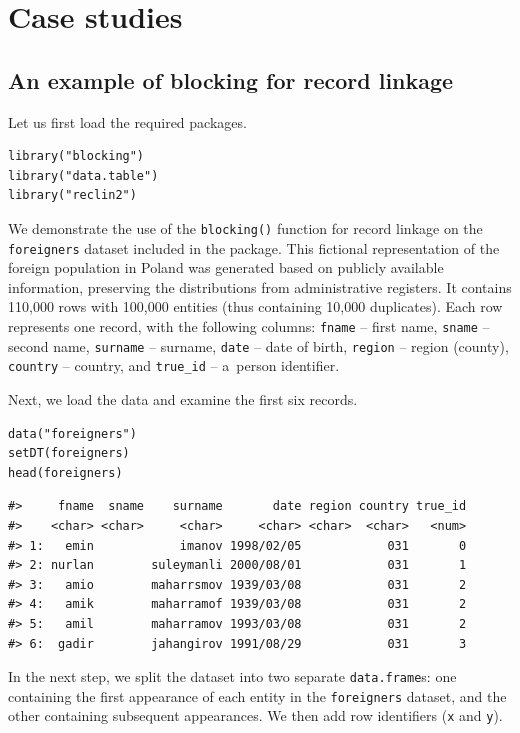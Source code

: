 \section{Case studies}\label{sec-case}

\subsection{An example of blocking for record linkage}\label{an-example-of-blocking-for-record-linkage}

Let us first load the required packages.

\begin{verbatim}
library("blocking")
library("data.table")
library("reclin2")
\end{verbatim}

We demonstrate the use of the \texttt{blocking()} function for record linkage
on the \texttt{foreigners} dataset included in the package. This fictional
representation of the foreign population in Poland was generated based
on publicly available information, preserving the distributions from
administrative registers. It contains 110,000 rows with 100,000 entities
(thus containing 10,000 duplicates). Each row represents one record,
with the following columns: \texttt{fname} -- first name, \texttt{sname} -- second
name, \texttt{surname} -- surname, \texttt{date} -- date of birth, \texttt{region} -- region
(county), \texttt{country} -- country, and \texttt{true\_id} -- a~person identifier.

Next, we load the data and examine the first six records.

\begin{verbatim}
data("foreigners")
setDT(foreigners)
head(foreigners)
\end{verbatim}

\begin{verbatim}
#>     fname  sname    surname       date region country true_id
#>    <char> <char>     <char>     <char> <char>  <char>   <num>
#> 1:   emin            imanov 1998/02/05            031       0
#> 2: nurlan        suleymanli 2000/08/01            031       1
#> 3:   amio        maharrsmov 1939/03/08            031       2
#> 4:   amik        maharramof 1939/03/08            031       2
#> 5:   amil        maharramov 1993/03/08            031       2
#> 6:  gadir        jahangirov 1991/08/29            031       3
\end{verbatim}

In the next step, we split the dataset into two separate \texttt{data.frame}s:
one containing the first appearance of each entity in the \texttt{foreigners}
dataset, and the other containing subsequent appearances. We then add
row identifiers (\texttt{x} and \texttt{y}).

